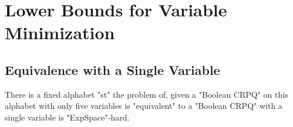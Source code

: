\section{Lower Bounds for Variable Minimization}
\AP\label{apdx-sec:lowerbound-variables}

\subsection{Equivalence with a Single Variable}

\begin{theorem}
	\AP\label{thm:variable-minimization-lowerbound}
	There is a fixed alphabet "st" the problem of, given a "Boolean CRPQ"
	on this alphabet with only five variables is "equivalent"
	to a "Boolean CRPQ" with a single variable is "ExpSpace"-hard.
\end{theorem}

